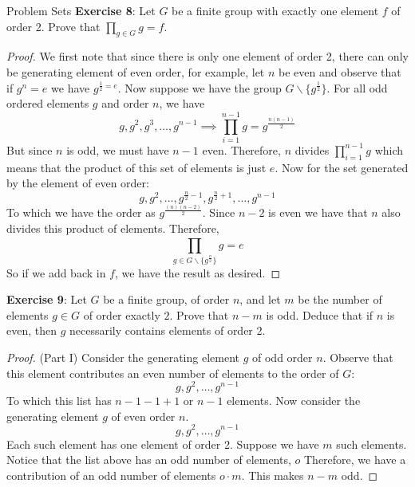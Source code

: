 \documentclass{report}
\begin{document}
\begin{exercises}{Problem Sets}
    \textbf{Exercise 8}: Let $G$ be a finite group with exactly one element $f$ of order 2. Prove that $\prod_{g \in G}^{} g = f$.
        \begin{proof}
            We first note that since there is only one element of order 2, there can only be generating element of even order, for example, let $n$ be even and observe that if $g^{n} =e$ we have $g^{\frac{1}{2} = e}$. Now suppose we have the group $G\backslash \{g^{\frac{1}{2}}\}$. For all odd ordered elements $g$ and order $n$, we have
                \begin{equation*}
                    g, g^{2}, g^{3}, \ldots, g^{n - 1} \implies \prod_{i = 1}^{n - 1} g = g^{\frac{n(n - 1)}{2}}
                \end{equation*}
            But since $n$ is odd, we must have $n - 1$ even. Therefore, $n$ divides $\prod_{i = 1}^{n - 1} g$ which means that the product of this set of elements is just $e$. Now for the set generated by the element of even order:
                \begin{equation*}
                    g, g^{2}, \ldots, g^{\frac{n}{2} - 1}, g^{\frac{n}{2} + 1}, \ldots, g^{n - 1}
                \end{equation*}
            To which we have the order as $g^{\frac{(n)(n - 2)}{2}}$. Since $n - 2$ is even we have that $n$ also divides this product of elements. Therefore, 
                \begin{equation*}
                    \prod_{g \in G \backslash \{g^{\frac{n}{2}}\}}^{} g = e
                \end{equation*}
            So if we add back in $f$, we have the result as desired.
        \end{proof}

    \textbf{Exercise 9}: Let $G$ be a finite group, of order $n$, and let $m$ be the number of elements $g \in G$ of order exactly $2$. Prove that $n - m$ is odd. Deduce that if $n$ is even, then $g$ necessarily contains elements of order 2.
        \begin{proof}
            (Part I) Consider the generating element $g$ of odd order $n$. Observe that this element contributes an even number of elements to the order of $G$:
                \begin{equation*}
                    g, g^{2}, \ldots, g^{n - 1}
                \end{equation*}
            To which this list has $n - 1 - 1 + 1$ or $n - 1$ elements. Now consider the generating element $g$ of even order $n$.
                \begin{equation*}
                    g, g^{2}, \ldots, g^{n - 1}
                \end{equation*}
            Each such element has one element of order 2. Suppose we have $m$ such elements. Notice that the list above has an odd number of elements, $o$ Therefore, we have a contribution of an odd number of elements $o \cdot m$. This makes $n - m$ odd. 


\end{proof}
\end{exercises}
\end{document}
